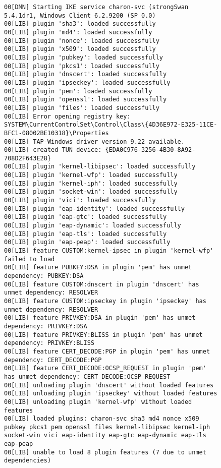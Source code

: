 \begin{figure}
\label{lst:debug-log}
\begin{lstlisting}[caption=Debug-Log; Zeigt Problematik mit WaitForSingleObject()]
00[DMN] Starting IKE service charon-svc (strongSwan 5.4.1dr1, Windows Client 6.2.9200 (SP 0.0)
00[LIB] plugin 'sha3': loaded successfully
00[LIB] plugin 'md4': loaded successfully
00[LIB] plugin 'nonce': loaded successfully
00[LIB] plugin 'x509': loaded successfully
00[LIB] plugin 'pubkey': loaded successfully
00[LIB] plugin 'pkcs1': loaded successfully
00[LIB] plugin 'dnscert': loaded successfully
00[LIB] plugin 'ipseckey': loaded successfully
00[LIB] plugin 'pem': loaded successfully
00[LIB] plugin 'openssl': loaded successfully
00[LIB] plugin 'files': loaded successfully
00[LIB] Error opening registry key: SYSTEM\CurrentControlSet\Control\Class\{4D36E972-E325-11CE-BFC1-08002BE10318}\Properties
00[LIB] TAP-Windows driver version 9.22 available.
00[LIB] created TUN device: {EDA0C976-3256-4B30-8A92-708D2F643E28}
00[LIB] plugin 'kernel-libipsec': loaded successfully
00[LIB] plugin 'kernel-wfp': loaded successfully
00[LIB] plugin 'kernel-iph': loaded successfully
00[LIB] plugin 'socket-win': loaded successfully
00[LIB] plugin 'vici': loaded successfully
00[LIB] plugin 'eap-identity': loaded successfully
00[LIB] plugin 'eap-gtc': loaded successfully
00[LIB] plugin 'eap-dynamic': loaded successfully
00[LIB] plugin 'eap-tls': loaded successfully
00[LIB] plugin 'eap-peap': loaded successfully
00[LIB] feature CUSTOM:kernel-ipsec in plugin 'kernel-wfp' failed to load
00[LIB] feature PUBKEY:DSA in plugin 'pem' has unmet dependency: PUBKEY:DSA
00[LIB] feature CUSTOM:dnscert in plugin 'dnscert' has unmet dependency: RESOLVER
00[LIB] feature CUSTOM:ipseckey in plugin 'ipseckey' has unmet dependency: RESOLVER
00[LIB] feature PRIVKEY:DSA in plugin 'pem' has unmet dependency: PRIVKEY:DSA
00[LIB] feature PRIVKEY:BLISS in plugin 'pem' has unmet dependency: PRIVKEY:BLISS
00[LIB] feature CERT_DECODE:PGP in plugin 'pem' has unmet dependency: CERT_DECODE:PGP
00[LIB] feature CERT_DECODE:OCSP_REQUEST in plugin 'pem' has unmet dependency: CERT_DECODE:OCSP_REQUEST
00[LIB] unloading plugin 'dnscert' without loaded features
00[LIB] unloading plugin 'ipseckey' without loaded features
00[LIB] unloading plugin 'kernel-wfp' without loaded features
00[LIB] loaded plugins: charon-svc sha3 md4 nonce x509 pubkey pkcs1 pem openssl files kernel-libipsec kernel-iph socket-win vici eap-identity eap-gtc eap-dynamic eap-tls eap-peap
00[LIB] unable to load 8 plugin features (7 due to unmet dependencies)

\end{lstlisting}
\end{figure}
